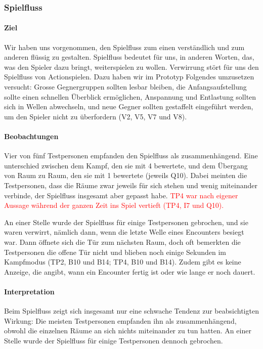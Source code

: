 \documentclass[../Main.tex]{subfiles}
\begin{document}
\subsubsection{Spielfluss}

\paragraph{Ziel}
Wir haben uns vorgenommen, den Spielfluss zum einen verständlich und zum anderen flüssig zu gestalten. Spielfluss bedeutet für uns, in anderen Worten, das, was den Spieler dazu bringt, weiterspielen zu wollen. Verwirrung stört für uns den Spielfluss von Actionspielen. Dazu haben wir im Prototyp Folgendes umzusetzen versucht: Grosse Gegnergruppen sollten lesbar bleiben, die Anfangsaufstellung sollte einen schnellen Überblick ermöglichen, Anspannung und Entlastung sollten sich in Wellen abwechseln, und neue Gegner sollten gestaffelt eingeführt werden, um den Spieler nicht zu überfordern (V2, V5, V7 und V8).

\paragraph{Beobachtungen}
Vier von fünf Testpersonen empfanden den Spielfluss als zusammenhängend. Eine unterschied zwischen dem Kampf, den sie mit 4 bewertete, und dem Übergang von Raum zu Raum, den sie mit 1 bewertete (jeweils Q10). Dabei meinten die Testpersonen, dass die Räume zwar jeweils für sich stehen und wenig miteinander verbinde, der Spielfluss insgesamt aber gepasst habe. \textcolor{red}{TP4 war nach eigener Aussage während der ganzen Zeit ins Spiel vertieft (TP4, I7 und Q10).}

An einer Stelle wurde der Spielfluss für einige Testpersonen gebrochen, und sie waren verwirrt, nämlich dann, wenn die letzte Welle eines Encounters besiegt war. Dann öffnete sich die Tür zum nächsten Raum, doch oft bemerkten die Testpersonen die offene Tür nicht und blieben noch einige Sekunden im Kampfmodus (TP2, B10 und B14; TP4, B10 und B14). Zudem gibt es keine Anzeige, die angibt, wann ein Encounter fertig ist oder wie lange er noch dauert.

\paragraph{Interpretation}
Beim Spielfluss zeigt sich insgesamt nur eine schwache Tendenz zur beabsichtigten Wirkung: Die meisten Testpersonen empfanden ihn als zusammenhängend, obwohl die einzelnen Räume an sich nichts miteinander zu tun hatten. An einer Stelle wurde der Spielfluss für einige Testpersonen dennoch gebrochen.
\end{document}
